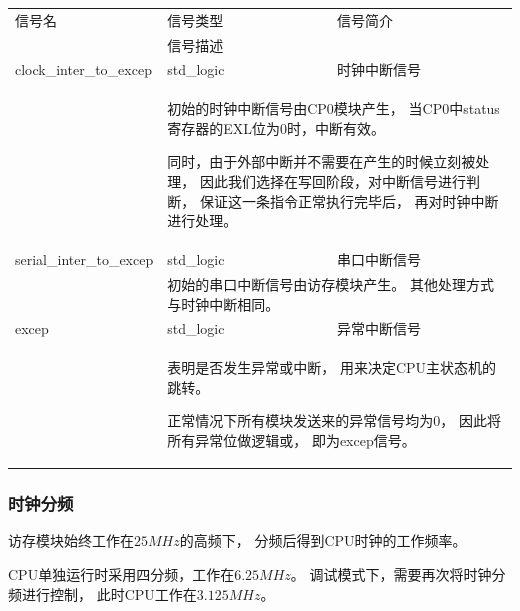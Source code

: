             \begin{tabularx}{\textwidth}{lll}
                \toprule
                信号名          & 信号类型  & 信号简介 \\
                \cmidrule(l){2-3}
                &
                \multicolumn{2}{X}{信号描述} \\
                \midrule
                clock\_inter\_to\_excep   & std\_logic    & 时钟中断信号 \\
                \cmidrule(l){2-3}
                &
                \multicolumn{2}{X}{
                    初始的时钟中断信号由CP0模块产生，
                    当CP0中status寄存器的EXL位为0时，中断有效。

                    同时，由于外部中断并不需要在产生的时候立刻被处理，
                    因此我们选择在写回阶段，对中断信号进行判断，
                    保证这一条指令正常执行完毕后，
                    再对时钟中断进行处理。
                } \\
                \midrule
                serial\_inter\_to\_excep   & std\_logic    & 串口中断信号 \\
                \cmidrule(l){2-3}
                &
                \multicolumn{2}{X}{
                    初始的串口中断信号由访存模块产生。
                    其他处理方式与时钟中断相同。
                } \\
                \midrule
                excep   & std\_logic    & 异常中断信号 \\
                \cmidrule(l){2-3}
                &
                \multicolumn{2}{X}{
                    表明是否发生异常或中断，
                    用来决定CPU主状态机的跳转。

                    正常情况下所有模块发送来的异常信号均为0，
                    因此将所有异常位做逻辑或，
                    即为excep信号。
                } \\
                \bottomrule
            \end{tabularx}

        \subsubsection{时钟分频}
            访存模块始终工作在$25MHz$的高频下，
            分频后得到CPU时钟的工作频率。
    
            CPU单独运行时采用四分频，工作在$6.25MHz$。
            调试模式下，需要再次将时钟分频进行控制，
            此时CPU工作在$3.125MHz$。

